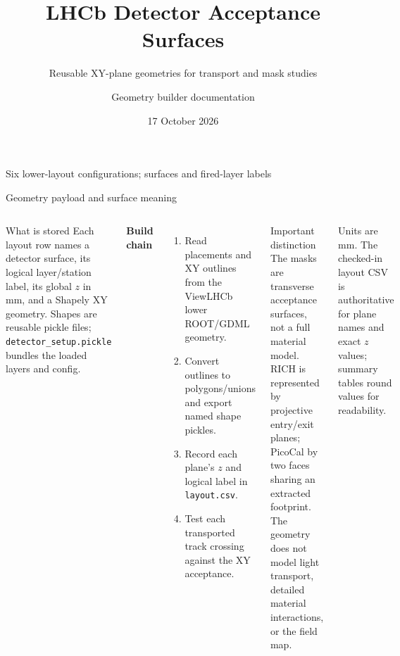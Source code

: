 \documentclass[aspectratio=169,10pt]{beamer}
\title{LHCb Detector Acceptance Surfaces}
\subtitle{Reusable XY-plane geometries for transport and mask studies}
\author{Geometry builder documentation}
\date{17 October 2026}
\begin{document}
\begin{frame}
  \titlepage
  \vspace{-2mm}
  \begin{center}\small Six lower-layout configurations; surfaces and fired-layer labels\end{center}
\end{frame}

\begin{frame}{Geometry payload and surface meaning}
\small
\begin{columns}[T,onlytextwidth]
  \begin{block}{What is stored}
    Each layout row names a detector surface, its logical layer/station label,
    its global $z$ in mm, and a Shapely XY geometry. Shapes are reusable pickle
    files; \texttt{detector\_setup.pickle} bundles the loaded layers and config.
  \end{block}
  \vspace{2mm}
  \textbf{Build chain}
  \begin{enumerate}
    \item Read placements and XY outlines from the ViewLHCb lower ROOT/GDML geometry.
    \item Convert outlines to polygons/unions and export named shape pickles.
    \item Record each plane's $z$ and logical label in \texttt{layout.csv}.
    \item Test each transported track crossing against the XY acceptance.
  \end{enumerate}
  \begin{block}{Important distinction}
    The masks are transverse acceptance surfaces, not a full material model.
    RICH is represented by projective entry/exit planes; PicoCal by two faces
    sharing an extracted footprint. The geometry does not model light transport,
    detailed material interactions, or the field map.
  \end{block}
  \vspace{2mm}
  \small Units are mm. The checked-in layout CSV is authoritative for plane
  names and exact $z$ values; summary tables round values for readability.
\end{columns}
\end{frame}
\end{document}
